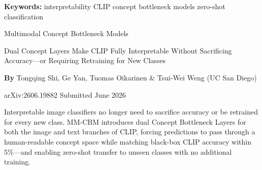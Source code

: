 \documentclass[10pt,twocolumn]{article}
\begin{document}
\setlength{\parindent}{0pt}
\setlength{\parskip}{4pt}

{\small\color{keywordgray}\textbf{Keywords:}
  interpretability \textbullet{}
  CLIP \textbullet{}
  concept bottleneck models \textbullet{}
  zero-shot classification}\par\vspace{4pt}

{\LARGE\bfseries\raggedright
  Multimodal Concept Bottleneck Models}\par\vspace{4pt}

{\large\itshape\raggedright
  Dual Concept Layers Make CLIP Fully Interpretable Without Sacrificing
  Accuracy---or Requiring Retraining for New Classes}\par\vspace{6pt}

{\small\textbf{By} Tongqing Shi, Ge Yan, Tuomas Oikarinen \& Tsui-Wei Weng
  (UC San Diego)}\par\vspace{2pt}

{\small\color{keywordgray}arXiv:2606.19882 \textbullet{} Submitted June 2026}
\par\vspace{2pt}\noindent{\color{rulered}\rule{\columnwidth}{0.6pt}}\vspace{6pt}

Interpretable image classifiers no longer need to sacrifice accuracy or be
retrained for every new class. MM-CBM introduces dual Concept Bottleneck
Layers for both the image and text branches of CLIP, forcing predictions to
pass through a human-readable concept space while matching black-box CLIP
accuracy within 5\%---and enabling zero-shot transfer to unseen classes
with no additional training.
\end{document}
